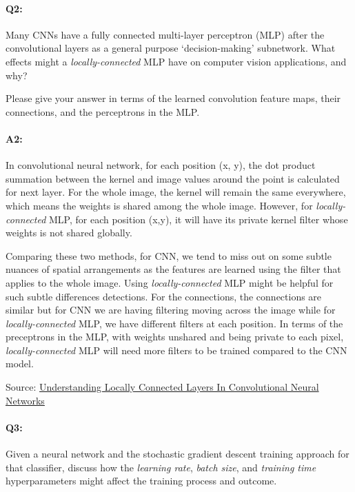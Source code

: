 \pagebreak
\paragraph{Q2:} Many CNNs have a fully connected multi-layer perceptron (MLP) after the convolutional layers as a general purpose `decision-making' subnetwork. What effects might a \emph{locally-connected} MLP have on computer vision applications, and why?

Please give your answer in terms of the learned convolution feature maps, their connections, and the perceptrons in the MLP.

\paragraph{A2:}

In convolutional neural network, for each position (x, y), the dot product summation between the kernel and image values around the point is calculated for next layer. For the whole image, the kernel will remain the same everywhere, which means the weights is shared among the whole image. However, for \emph{locally-connected} MLP, for each position (x,y), it will have its private kernel filter whose weights is not shared globally.

Comparing these two methods, for CNN, we tend to miss out on some subtle nuances of spatial arrangements as the features are learned using the filter that applies to the whole image. Using \emph{locally-connected} MLP might be helpful for such subtle differences detections. For the connections, the connections are similar but for CNN we are having filtering moving across the image while for \emph{locally-connected} MLP, we have different filters at each position. In terms of the preceptrons in the MLP, with weights unshared and being private to each pixel, \emph{locally-connected} MLP will need more filters to be trained compared to the CNN model.

Source: \href{https://prateekvjoshi.com/2016/04/12/understanding-locally-connected-layers-in-convolutional-neural-networks/}{Understanding Locally Connected Layers In Convolutional Neural Networks}

\pagebreak
\paragraph{Q3:} Given a neural network and the stochastic gradient descent training approach for that classifier, discuss how the \emph{learning rate}, \emph{batch size}, and \emph{training time} hyperparameters might affect the training process and outcome.

